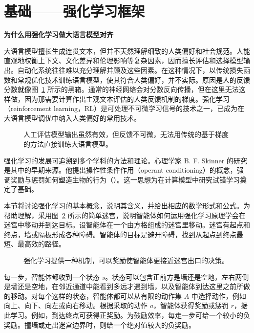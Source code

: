 \section{基础——强化学习框架}
\label{sec:ch05-rl}
\begin{keypoint}
\noindent\textbf{为什么用强化学习做大语言模型对齐}

大语言模型擅长生成连贯文本，但并不天然理解细致的人类偏好和社会规范。人能直观地权衡上下文、文化差异和伦理影响等复杂因素，因而擅长评估和选择模型输出。自动化系统往往难以充分理解并顾及这些因素。在这种情况下，以传统损失函数和常规优化技术训练语言模型，使其符合人类偏好，并不实际。原因是人的反馈分数就像图~\ref{fig:ch05-feedback} 所示的黑箱。通常的神经网络会对分数反向传播，但在这里无法这样做，因为那需要计算作出主观文本评估的人类反馈机制的梯度。强化学习（reinforcement learning，RL）是可处理不可微学习信号的技术之一，已成为在大语言模型调优中纳入人类偏好的常用技术。
\end{keypoint}

\begin{figure}[!htbp]
\centering

\caption{人工评估模型输出虽然有效，但反馈不可微，无法用传统的基于梯度的方法直接训练大语言模型。}
\label{fig:ch05-feedback}
\end{figure}

强化学习的发展可追溯到多个学科的方法和理论。心理学家 B. F. Skinner 的研究是其中的早期来源。他提出操作性条件作用（operant conditioning）的概念，强调奖励与惩罚如何塑造生物的行为（）。这一思想为在计算模型中研究试错学习奠定了基础。

本节将讨论强化学习的基本概念，说明其含义，并给出相应的数学形式和公式。为帮助理解，采用图~\ref{fig:ch05-maze} 所示的简单迷宫，说明智能体如何运用强化学习原理学会在迷宫中移动并到达目标。设智能体在一个由方格组成的迷宫里移动。迷宫有起点和终点，墙或隔板形成各种障碍。智能体的目标是避开障碍，找到从起点到终点最短、最高效的路径。

\begin{figure}[!htbp]
\centering

\caption{强化学习提供一种机制，可以奖励使智能体更接近迷宫出口的决策。}
\label{fig:ch05-maze}
\end{figure}

每一步，智能体都收到一个状态 $s$。状态可以包含正前方是墙还是空地，左右两侧是墙还是空地，在邻近通道中能看到多远才遇到墙，以及智能体到达这里之前所做的移动。对每个这样的状态，智能体都可以从有限的动作集 $A$ 中选择动作，例如向上、向下、向左或向右移动。根据采取的动作 $a$，智能体获得奖励或惩罚 $r$，据此学习。例如，到达终点可获得正奖励。为鼓励效率，每走一步可给一个较小的负奖励。撞墙或走出迷宫边界时，则给一个绝对值较大的负奖励。

